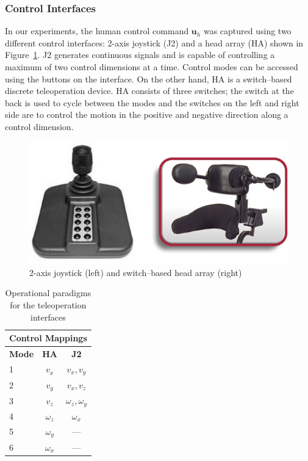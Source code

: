 \documentclass[conference]{IEEEtran}
\begin{document}
\subsubsection{Control Interfaces}
In our experiments, the human control command $\boldsymbol{u}_h$ was captured using two different control interfaces: 2-axis joystick (J2) and a head array (HA) shown in Figure~\ref{J2_HA}. 
J2 generates continuous signals and is capable of controlling a maximum of two control dimensions at a time.  Control modes can be accessed using the buttons on the interface. 
On the other hand, HA is a switch--based discrete teleoperation device. HA consists of three switches; the switch at the back is used to cycle between the modes and the switches on the left and right side are to control the motion in the positive and negative direction along a control dimension. 
\begin{figure}[h]
		\centering
	\includegraphics[width = 0.6\hsize, height = 0.13\vsize]{./figures/J2_HA.png}
	\caption{2-axis joystick (left) and switch--based head array (right)}
	\label{J2_HA}
\end{figure}

	\begin{table}
	\centering
	\begin{tabular}{|l|c|c|}
		\hline
		\multicolumn{3}{|c|}{Control Mappings} \\
		\hline
		\textbf{Mode} & \textbf{HA} & \textbf{J2}\\
		\hline
		1 & $v_{x}$ & $v_{x}, v_{y}$ \\ \hline
		2 & $v_{y}$   & $v_{x}, v_{z}$ \\ \hline
		3 & $v_{z}$ &  $\omega_{z}, \omega_{y}$ \\ \hline
		4 & $\omega_{z}$ &  $\omega_{x}$ \\ \hline
		5 & $\omega_{y}$ &   --- \\ \hline
		6 & $\omega_{x}$ &  --- \\ \hline 
	\end{tabular}
	\vspace{.2cm}
	\caption{Operational paradigms for the teleoperation interfaces} 
	\label{CIM}
	\vspace{-.5cm}
\end{table}
\end{document}
